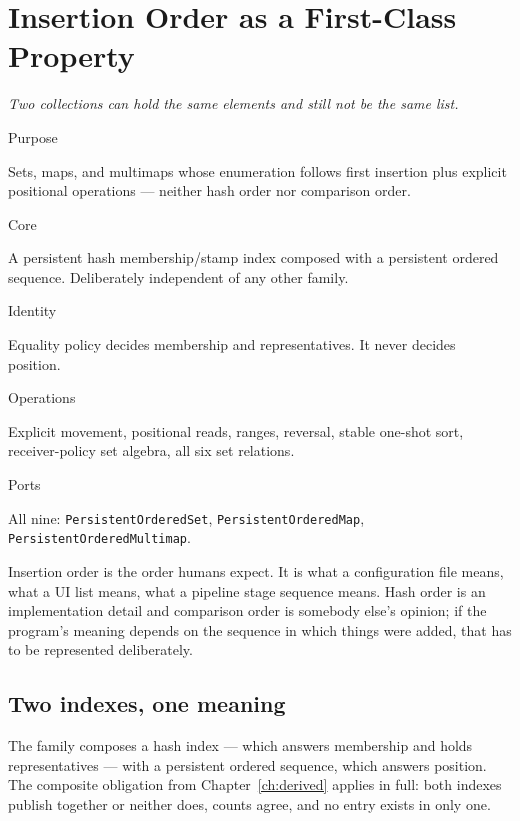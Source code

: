 \documentclass[11pt,twoside,openright]{book}
\newcommand{\code}[1]{\texorpdfstring{\textcolor{d7ink}{\texttt{#1}}}{#1}}
\newcommand{\motto}[1]{%
  \begingroup
  \vspace{-4pt}\hfill\begin{minipage}{0.80\textwidth}
    \raggedleft\itshape\color{d7slate}\small #1\par
  \end{minipage}\par\vspace{18pt}
  \endgroup}
\newcommand{\spec}[2]{%
  \par\noindent
  \parbox[t]{0.21\linewidth}{\raggedright\sffamily\bfseries\footnotesize
    \color{d7slate}\strut #1}%
  \hspace{9pt}%
  \parbox[t]{\dimexpr0.79\linewidth-9pt\relax}{\raggedright\strut #2}%
  \par\vspace{3.5pt}}
\newenvironment{specimen}[1][Specimen]
  {\begin{glancebox}[#1]\small\setlength{\parindent}{0pt}}
  {\end{glancebox}}
\begin{document}
\chapter{Insertion Order as a First-Class Property}
\label{ch:ordered}

\motto{Two collections can hold the same elements and still not be the same
list.}

\begin{specimen}[Specimen --- the neutral Ordered family]
%
\spec{Purpose}{Sets, maps, and multimaps whose enumeration follows first insertion plus explicit positional operations --- neither hash order nor comparison order.}
\spec{Core}{A persistent hash membership/stamp index composed with a persistent ordered sequence. Deliberately independent of any other family.}
\spec{Identity}{Equality policy decides membership and representatives. It never decides position.}
\spec{Operations}{Explicit movement, positional reads, ranges, reversal, stable one-shot sort, receiver-policy set algebra, all six set relations.}
\spec{Ports}{All nine: \code{PersistentOrderedSet}, \code{PersistentOrderedMap}, \code{PersistentOrderedMultimap}.}
\end{specimen}

\noindent
Insertion order is the order humans expect. It is what a configuration file
means, what a UI list means, what a pipeline stage sequence means. Hash order is
an implementation detail and comparison order is somebody else's opinion; if the
program's meaning depends on the sequence in which things were added, that has
to be represented deliberately.

\section{Two indexes, one meaning}

The family composes a hash index --- which answers membership and holds
representatives --- with a persistent ordered sequence, which answers position.
The composite obligation from Chapter~\ref{ch:derived} applies in full: both
indexes publish together or neither does, counts agree, and no entry exists in
only one.
\end{document}
